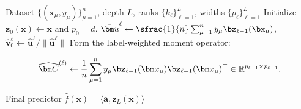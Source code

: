 \begin{algorithm}
\caption{Neural Low-Degree Filtering}
\label{2605:alg:neural-lofi}
\begin{algorithmic}[1]
\Require Dataset $\{(\bm x_\mu,y_\mu)\}_{\mu=1}^n$, depth $L$, ranks $\{k_\ell\}_{\ell=1}^L$, widths $\{p_\ell\}_{\ell=1}^L$
\State Initialize $\bm z_0(\bm x)\gets \bm x$ and $p_0 = d$.
    \State $\hat{\bm u}^\ell  \leftarrow \sfrac{1}{n}\sum_{\mu=1}^n y_{\mu} \bz_{\ell-1}(\bx_\mu)$, $\hat{\bm v}^\ell_0 \leftarrow \hat{\bm u}^\ell / \|\hat{\bm u}^\ell\|$
    \State Form the label-weighted moment operator:

\[
        \widehat{\bm C}^{(\ell)}
        \gets
        \frac1n
        \sum_{\mu=1}^n
        y_\mu 
      \bz_{\ell-1}(\bm x_\mu)
        \bz_{\ell-1}(\bm x_\mu)^\top \in \mathbb{R}^{p_{\ell-1} \times p_{\ell - 1}}.
\]

\EndFor
{}
\State \Return Final predictor $\hat f(\bm x)=\langle \bm a,\bm z_L(\bm x)\rangle$
\end{algorithmic}
\end{algorithm}

